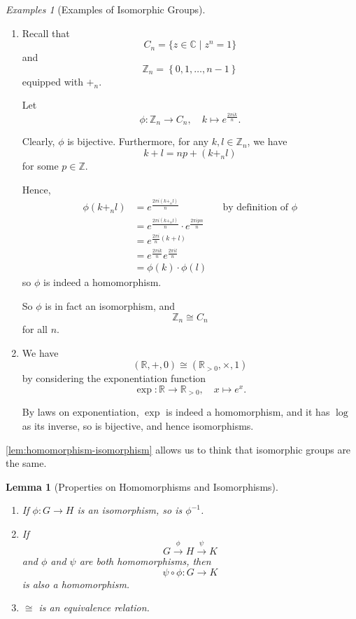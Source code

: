 \documentclass{article}
\newtheorem{lemma}[theorem]{Lemma}
\theoremstyle{definition}
\theoremstyle{remark}
\newcommand{\pqty}[1]{\left(#1\right)}
\newcommand{\Bqty}[1]{\left\{#1\right\}}
\newcommand{\set}[2]{\{#1\mid #2\}}
\newcommand{\functiondomain}[3]{#1:#2\to #3}
\newcommand{\function}[5]{#1:#2\to #3,\quad #4\mapsto #5}
\newcommand{\inverse}{^{-1}}
\newcommand{\isomorphic}{\cong}
\newcommand{\ZZ}{\mathbb{Z}}
\newcommand{\RR}{\mathbb{R}}
\newcommand{\CC}{\mathbb{C}}
\newtheorem*{examples*}{Examples}
\begin{document}
\begin{examples*}[Examples of Isomorphic Groups]
    \begin{enumerate}
        \item Recall that
        \[
            C_n = \set{z \in \CC}{z^n = 1}
        \]
        and
        \[
            \ZZ_n = \Bqty{0, 1, \ldots, n - 1}
        \]
        equipped with \(+_n\).

        Let
        \[
            \function{\phi}{\ZZ_n}{C_n}{k}{e^{\frac{2 \pi i k}{n}}.}
        \]

        Clearly, \(\phi\) is bijective. Furthermore, for any \(k, l \in \ZZ_{n}\), we have
        \[
            k + l = np + \pqty{k +_n l}
        \]
        for some \(p \in \ZZ\).

        Hence,
        \begin{align*}
            \phi\pqty{k +_n l} &= e^{\frac{2 \pi i \pqty{k +_n l}}{n}} && \text{by definition of }\phi \\
            &= e^{\frac{2 \pi i \pqty{k +_n l}}{n}} \cdot e^{\frac{2 \pi i p n}{n}} \\
            &= e^{\frac{2 \pi i}{n} \pqty{k + l}} \\
            &= e^{\frac{2 \pi i k}{n}} e^{\frac{2 \pi i l}{n}} \\
            &= \phi\pqty{k} \cdot \phi\pqty{l}
        \end{align*}
        so \(\phi\) is indeed a homomorphism.

        So \(\phi\) is in fact an isomorphism, and
        \[
            \ZZ_{n} \isomorphic C_n
        \]
        for all \(n\).

        \item We have
        \[
            \pqty{\RR, +, 0} \isomorphic \pqty{\RR_{>0}, \times, 1}
        \]
        by considering the exponentiation function
        \[
            \function{\exp}{\RR}{\RR_{>0}}{x}{e^x.}
        \]

        By laws on exponentiation, \(\exp\) is indeed a homomorphism, and it has \(\log\) as its inverse, so is bijective, and hence isomorphisms.
    \end{enumerate}
\end{examples*}

\autoref{lem:homomorphism-isomorphism} allows us to think that isomorphic groups are the same.

\begin{lemma}[Properties on Homomorphisms and Isomorphisms]
    \label{lem:homomorphism-isomorphism}%
    \begin{enumerate}
        \item If \(\functiondomain{\phi}{G}{H}\) is an isomorphism, so is \(\phi \inverse\).
        \item If
        \[
            G \xrightarrow{\phi} H \xrightarrow{\psi} K
        \]
        and \(\phi\) and \(\psi\) are both homomorphisms, then
        \[
            \functiondomain{\psi \circ \phi}{G}{K}
        \]
        is also a homomorphism.
        \item \(\isomorphic\) is an equivalence relation.
    \end{enumerate}
\end{lemma}
\end{document}
